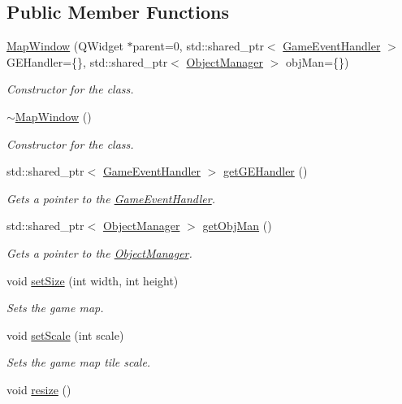 \subsection*{Public Member Functions}
\begin{DoxyCompactItemize}
\item 
\hyperlink{classMapWindow_a1384c7a04267c23e413304b575870ddf}{Map\-Window} (Q\-Widget $\ast$parent=0, std\-::shared\-\_\-ptr$<$ \hyperlink{classGameEventHandler}{Game\-Event\-Handler} $>$ G\-E\-Handler=\{\}, std\-::shared\-\_\-ptr$<$ \hyperlink{classObjectManager}{Object\-Manager} $>$ obj\-Man=\{\})
\begin{DoxyCompactList}\small\item\em Constructor for the class. \end{DoxyCompactList}\item 
\hypertarget{classMapWindow_a12edf2fb9ac7a6ebf501c0da8aa327dc}{\hyperlink{classMapWindow_a12edf2fb9ac7a6ebf501c0da8aa327dc}{$\sim$\-Map\-Window} ()}\label{classMapWindow_a12edf2fb9ac7a6ebf501c0da8aa327dc}

\begin{DoxyCompactList}\small\item\em Constructor for the class. \end{DoxyCompactList}\item 
std\-::shared\-\_\-ptr$<$ \hyperlink{classGameEventHandler}{Game\-Event\-Handler} $>$ \hyperlink{classMapWindow_a1ec4c2876b71f131fa00f1189e2c9a99}{get\-G\-E\-Handler} ()
\begin{DoxyCompactList}\small\item\em Gets a pointer to the \hyperlink{classGameEventHandler}{Game\-Event\-Handler}. \end{DoxyCompactList}\item 
std\-::shared\-\_\-ptr$<$ \hyperlink{classObjectManager}{Object\-Manager} $>$ \hyperlink{classMapWindow_a5e172f1f313d7390306515cdb0fc3305}{get\-Obj\-Man} ()
\begin{DoxyCompactList}\small\item\em Gets a pointer to the \hyperlink{classObjectManager}{Object\-Manager}. \end{DoxyCompactList}\item 
void \hyperlink{classMapWindow_a7b5fcf2d1ba7c211faabdfd3c81cc5b5}{set\-Size} (int width, int height)
\begin{DoxyCompactList}\small\item\em Sets the game map. \end{DoxyCompactList}\item 
void \hyperlink{classMapWindow_a9d5c988b6ac8dced6aa128df160be6cc}{set\-Scale} (int scale)
\begin{DoxyCompactList}\small\item\em Sets the game map tile scale. \end{DoxyCompactList}\item 
\hypertarget{classMapWindow_a9eebe13b89eacd419ed5c250a9fc1d2e}{void \hyperlink{classMapWindow_a9eebe13b89eacd419ed5c250a9fc1d2e}{resize} ()}\label{classMapWindow_a9eebe13b89eacd419ed5c250a9fc1d2e}


\end{DoxyCompactItemize}
